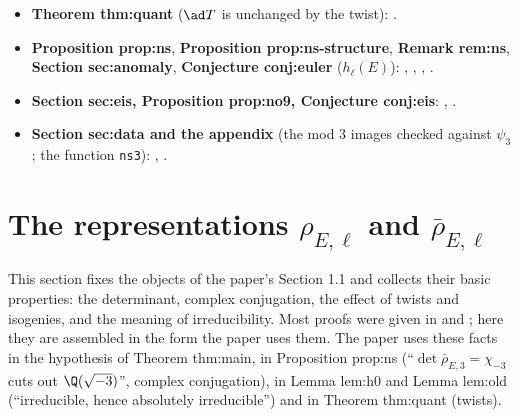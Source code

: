 \begin{itemize}
, .
\item \textbf{Theorem thm:quant} ($\ad T$ is unchanged by the twist): .
\item \textbf{Proposition prop:ns}, \textbf{Proposition prop:ns-structure}, \textbf{Remark rem:ns}, \textbf{Section sec:anomaly}, \textbf{Conjecture
conj:euler} ($h_\ell(E)$): , , , .
\item \textbf{Section sec:eis, Proposition prop:no9, Conjecture conj:eis}: , .
\item \textbf{Section sec:data and the appendix} (the mod $3$ images checked against $\psi_3$; the function \texttt{ns3}):
, .
\end{itemize}

\section{The representations \texorpdfstring{$\rho_{E,\ell}$ and $\bar\rho_{E,\ell}$}{rho and rhobar}}\label{sec:galrep:reps}

This section fixes the objects of the paper's Section 1.1 and collects their basic properties: the determinant, complex
conjugation, the effect of twists and isogenies, and the meaning of irreducibility. Most proofs were given in
 and ; here they are assembled in the form the paper uses them. The paper uses these facts in the
hypothesis of Theorem thm:main, in Proposition prop:ns (``$\det\bar\rho_{E,3}=\chi_{-3}$ cuts out $\Q(\sqrt{-3})$'', complex conjugation),
in Lemma lem:h0 and Lemma lem:old (``irreducible, hence absolutely irreducible'') and in Theorem thm:quant (twists).

